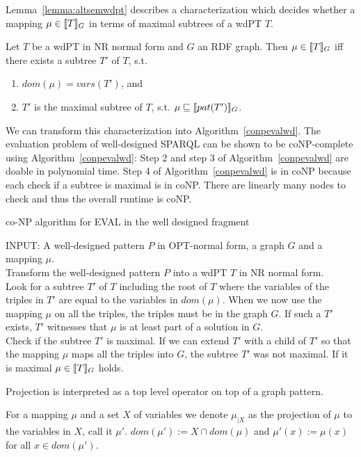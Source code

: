 Lemma~\ref{lemma:altsemwdpt} describes a characterization which decides whether
a mapping $\mu \in \llbracket T\rrbracket_G$ in terms of maximal subtrees of a wdPT $T$.  

\begin{lemma}\label{lemma:altsemwdpt}
	Let $T$ be a wdPT in NR normal form and $G$ an RDF graph. Then $\mu \in
	\llbracket T\rrbracket_G$ iff there exists a subtree $T'$ of $T$, s.t. 
	\begin{enumerate}
		\item  $dom(\mu) = vars(T')$, and
		\item $T'$ is the maximal subtree of $T$, s.t. $\mu \sqsubseteq \llbracket
			pat(T') \rrbracket_G$.
	\end{enumerate}
\end{lemma}

We can transform this characterization into Algorithm~\ref{conpevalwd}.
The evaluation problem of well-designed SPARQL can be shown to be coNP-complete using
Algorithm~\ref{conpevalwd}: 
Step 2 and step 3 of Algorithm~\ref{conpevalwd} are doable in polynomial time.
Step 4 of Algorithm~\ref{conpevalwd} is in coNP because each check if a subtree
is maximal is in coNP. There are linearly many nodes to check and thus the
overall runtime is coNP.

\begin{algorithm}
	\caption{co-NP algorithm for EVAL in the well designed
	fragment~\cite{letelier2012static}}
	\label{conpevalwd}
	INPUT: A well-designed pattern $P$ in OPT-normal form, a graph $G$ and a mapping
	$\mu$.\\
	Transform the well-designed pattern $P$ into a wdPT $T$ in NR normal form.  \\
	Look for a subtree $T'$ of $T$ including the root of $T$ where the
	variables of the triples in $T'$ are equal to the variables in $dom(\mu)$. 
	When we now use the mapping $\mu$ on all the triples, the triples must
	be in the graph $G$. If such a $T'$	exists, $T'$ witnesses that $\mu$ is at least part of a solution in
	$G$.\\
	Check if the subtree $T'$ is maximal. If we can
	extend $T'$ with a child of $T'$ so that the mapping $\mu$ maps
	all the triples into $G$, the subtree $T'$ was not maximal. 
	If it is maximal $\mu \in \llbracket T \rrbracket_G$ holds.
\end{algorithm}

Projection is interpreted as a top level operator on top of a graph pattern.
\begin{definition}
For a mapping $\mu$ and a set $X$ of variables we denote $\mu_{|X}$ as the
projection of $\mu$ to the variables in $X$, call it $\mu'$. $dom(\mu'):=X \cap
dom(\mu)$ and $\mu'(x) := \mu(x)$ for all $x \in dom(\mu')$.
\end{definition}

